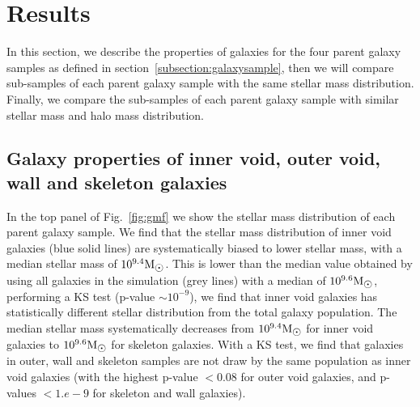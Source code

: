 \documentclass[a4paper,fleqn,usenatbib,letter]{mnras}
\newcommand{\Msun}{\rm M_{\sun}}
\begin{document}
\section{Results}
In this section, we describe  the properties of galaxies for the four parent galaxy samples as defined in section~\ref{subsection:galaxysample}, then we will compare sub-samples of each parent galaxy sample  with the same stellar mass distribution. Finally, we compare the sub-samples of each parent galaxy sample with similar  stellar mass and halo mass distribution. 

\subsection{Galaxy properties of inner void, outer void, wall and skeleton galaxies}

In the top  panel of  Fig.~\ref{fig:gmf} we show the stellar mass distribution of each parent galaxy sample. 
We find that the stellar mass distribution of inner void galaxies (blue solid lines) are systematically  biased to lower stellar mass, with a median stellar mass of $10^{9.4}\Msun$. This is lower than the median value obtained by using all galaxies in the simulation (grey lines) with a median of $10^{9.6}\Msun$, performing a KS test (p-value $\sim 10^{-9}$), we find that inner void galaxies has statistically  different stellar distribution from the total galaxy population. The median stellar mass systematically decreases from $10^{9.4}\Msun$ for inner void galaxies to  $10^{9.6}\Msun$  for  skeleton galaxies. With a KS test,  we find that galaxies in outer, wall and skeleton samples are not draw by the same population as inner void galaxies (with the highest  p-value $<0.08$ for outer void galaxies, and p-values $<1.e-9$ for  skeleton and wall galaxies). 
\end{document}

